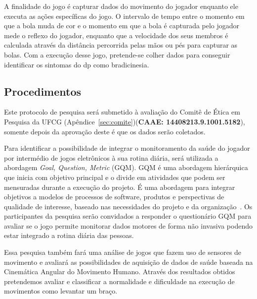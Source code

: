 A finalidade do jogo é capturar dados do movimento do jogador enquanto ele executa as ações específicas do jogo. O intervalo de tempo entre o momento em que a bola muda de cor e o momento em que a bola é capturada pelo jogador mede o reflexo do jogador, enquanto que a velocidade dos seus membros é calculada através da distância percorrida pelas mãos ou pés para capturar as bolas.
Com a execução desse jogo, pretende-se colher dados para conseguir identificar os sintomas do \ac{dp} como bradicinesia.



\subsection{Procedimentos}

Este protocolo de pesquisa será submetido à avaliação do Comitê de Ética em Pesquisa da UFCG (Apêndice~\ref{sec:comite})(\textbf{CAAE: 14408213.9.1001.5182}), somente depois da aprovação deste é que os dados serão coletados.

Para identificar a possibilidade de integrar o monitoramento da saúde do jogador por intermédio de jogos eletrônicos à sua rotina diária, será utilizada a abordagem \textit{Goal, Question, Metric} (GQM). GQM é uma abordagem hierárquica que inicia com objetivo principal e o divide em atividades que podem ser mensuradas durante a execução do projeto. É uma abordagem para integrar objetivos a modelos de processos de software, produtos e perspectivas de qualidade de interesse, baseado nas necessidades do projeto e da organização~\cite{van1999goal}. Os participantes da pesquisa serão convidados a responder o questionário GQM para avaliar se o jogo permite monitorar dados motores de forma não invasiva podendo estar integrado a rotina diária das pessoas.

Essa pesquisa também fará uma análise de jogos que fazem uso de sensores de movimento e avaliará as possibilidades de aquisição de dados de saúde baseada na Cinemática Angular do Movimento Humano. Através dos resultados obtidos pretendemos avaliar e classificar a normalidade e dificuldade na %
execução de movimentos como levantar um braço.

